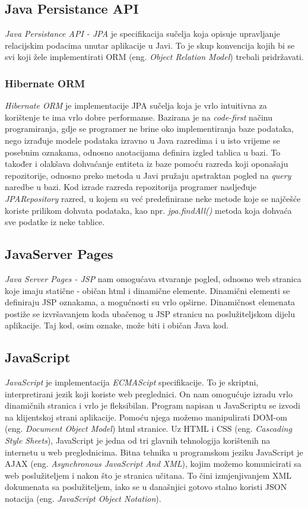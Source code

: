 \documentclass[zavrsni, numeric]{fer}
\begin{document}
\subsection{Java Persistance API}
\textit{Java Persistance API - JPA}\citep{jpa} je specifikacija sučelja koja opisuje upravljanje relacijskim podacima unutar aplikacije u Javi. To je skup konvencija kojih bi se svi koji žele implementirati ORM (eng. \textit{Object Relation Model}) trebali pridržavati.

\subsubsection{Hibernate ORM}
\textit{Hibernate ORM}\citep{hibernate} je implementacije JPA sučelja koja je vrlo intuitivna za korištenje te ima vrlo dobre performanse. Bazirana je na \textit{code-first} načinu programiranja, gdje se programer ne brine oko implementiranja baze podataka, nego izrađuje modele podataka izravno u Java razredima i u isto vrijeme se posebnim oznakama, odnosno anotacijama definira izgled tablica u bazi. To također i olakšava dohvaćanje entiteta iz baze pomoću razreda koji oponašaju repozitorije, odnosno preko metoda u Javi pružaju apstraktan pogled na \textit{query} naredbe u bazi. Kod izrade razreda repozitorija programer nasljeđuje \textit{JPARepository} razred, u kojem su već predefinirane neke metode koje se najčešće koriste prilikom dohvata podataka, kao npr. \textit{jpa.findAll()} metoda koja dohvaća sve podatke iz neke tablice.

\subsection{JavaServer Pages}
\textit{Java Server Pages - JSP}\citep{jsp} nam omogućava stvaranje pogled, odnosno web stranica koje imaju statične - običan html i dinamične elemente. Dinamični elementi se definiraju JSP oznakama, a mogućnosti su vrlo opširne. Dinamičnost elemenata postiže se izvršavanjem koda ubačenog u JSP stranicu na poslužiteljskom dijelu aplikacije. Taj kod, osim oznake, može biti i običan Java kod.

\subsection{JavaScript}
\textit{JavaScript} je implementacija \textit{ECMAScipt}\citep{ecma-script} specifikacije. To je skriptni, interpretirani jezik koji koriste web preglednici. On nam omogućuje izradu vrlo dinamičnih stranica i vrlo je fleksibilan. Program napisan u JavaScriptu se izvodi na klijentskoj strani aplikacije. Pomoću njega možemo manipulirati DOM-om (eng. \textit{Document Object Model}) html stranice. Uz HTML i CSS (eng. \textit{Cascading Style Sheets}), JavaScript je jedna od tri glavnih tehnologija korištenih na internetu u web preglednicima. Bitna tehnika u programskom jeziku JavaScript je AJAX (eng. \textit{Asynchronous JavaScript And XML}), kojim možemo komunicirati sa web poslužiteljem i nakon što je stranica učitana. To čini izmjenjivanjem XML dokumenata sa poslužiteljem, iako se u današnjici gotovo stalno koristi JSON notacija (eng. \textit{JavaScript Object Notation}). 
\end{document}
